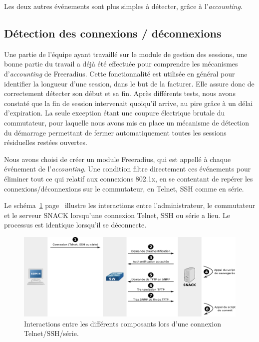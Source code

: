 Les deux autres événements sont plus simples à détecter, grâce à l'\emph{accounting}.

\subsection{Détection des connexions / déconnexions}

Une partie de l'équipe ayant travaillé sur le module de gestion des sessions, une bonne partie du travail a déjà été effectuée pour comprendre les mécanismes d'\emph{accounting} de Freeradius. Cette fonctionnalité est utilisée en général pour identifier la longueur d'une session, dans le but de la facturer. Elle assure donc de correctement détecter son début et sa fin. Après différents tests, nous avons constaté que la fin de session intervenait quoiqu'il arrive, au pire grâce à un délai d'expiration. La seule exception étant une coupure électrique brutale du commutateur, pour laquelle nous avons mis en place un mécanisme de détection du démarrage permettant de fermer automatiquement toutes les sessions résiduelles restées ouvertes.

Nous avons choisi de créer un module Freeradius, qui est appellé à chaque événement de l'\emph{accounting}. Une condition filtre directement ces événements pour éliminer tout ce qui relatif aux connexions 802.1x, en se contentant de repérer les connexions/déconnexions sur le commutateur, en Telnet, SSH comme en série.

Le schéma~\ref{schema_auth} page~\pageref{schema_auth} illustre les interactions entre l'administrateur, le commutateur et le serveur SNACK lorsqu'une connexion Telnet, SSH ou série a lieu. Le processus est identique lorsqu'il se déconnecte.

\begin{figure}[!h]
	\begin{center}
	    \includegraphics[width=\textwidth]{img/auth.pdf}
	\end{center}
	\caption{Interactions entre les différents composants lors d'une connexion Telnet/SSH/série.}
	\label{schema_auth}
\end{figure}


